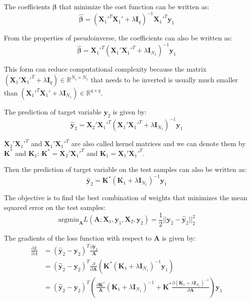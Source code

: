 \documentclass[a4paper,11pt]{article}
\begin{document}
The coefficients $\boldsymbol{\beta}$ that minimize the cost function can be written as:
\begin{equation}
\hat{\boldsymbol{\beta}} = (\mathbf{X}_1'^T \mathbf{X}_1' + \lambda \mathbf{I}_{q})^{-1} \mathbf{X}_1'^T \mathbf{y}_1
\end{equation}

From the properties of pseudoinverse, the coefficients can also be written as:
\begin{equation}
\hat{\boldsymbol{\beta}} = \mathbf{X}_1'^T (\mathbf{X}_1' \mathbf{X}_1'^T + \lambda \mathbf{I}_{N_1})^{-1} \mathbf{y}_1
\end{equation}

This form can reduce computational complexity because the matrix $(\mathbf{X}_1' \mathbf{X}_1'^T + \lambda \mathbf{I}_{q}) \in \mathbb{R}^{N_1 \times N_1}$ 
that needs to be inverted is usually much smaller than $(\mathbf{X}_1'^T \mathbf{X}_1' + \lambda \mathbf{I}_{N_1}) \in \mathbb{R}^{q \times q}$.

The prediction of target variable $\mathbf{y}_2$ is given by:
\begin{equation}
\hat{\mathbf{y}}_2 = \mathbf{X}_2' \mathbf{X}_1'^T (\mathbf{X}_1' \mathbf{X}_1'^T + \lambda \mathbf{I}_{N_1})^{-1} \mathbf{y}_1
\end{equation}

$\mathbf{X}_2' \mathbf{X}_1'^T$ and $\mathbf{X}_1' \mathbf{X}_1'^T$ are also called kernel matrices and we can denote them by $\mathbf{K}^{*}$ 
and $\mathbf{K}_1$: $\mathbf{K}^{*} = \mathbf{X}_2' \mathbf{X}_1'^T$ and $\mathbf{K}_1 = \mathbf{X}_1' \mathbf{X}_1'^T$.

Then the prediction of target variable on the test samples can also be written as:
\begin{equation}
\hat{\mathbf{y}}_2 = \mathbf{K}^{*} (\mathbf{K}_1 + \lambda \mathbf{I}_{N_1})^{-1} \mathbf{y}_1
\end{equation}

The objective is to find the best combination of weights that minimizes the mean squared error on the test samples:
\begin{equation}
\text{argmin}_{\mathbf{A}} L(\mathbf{A}; \mathbf{X}_1, \mathbf{y}_1, \mathbf{X}_2, \mathbf{y}_2 ) = \frac{1}{2} || \mathbf{y}_2 - \hat{\mathbf{y}}_2 ||_2^2
\end{equation}

The gradients of the loss function with respect to $\mathbf{A}$ is given by:
\begin{align}
\frac{\partial L} {\partial A} &= (\hat{\mathbf{y}}_2 - \mathbf{y}_2)^{T} \frac{\partial{\hat{\mathbf{y}}_2}} {\mathbf{A}} \\
&= (\hat{\mathbf{y}}_2 - \mathbf{y}_2)^{T}  \frac{\partial}{\partial \mathbf{A}} (\mathbf{K}^{*} (\mathbf{K}_1 + \lambda \mathbf{I}_{N_1})^{-1} \mathbf{y}_1) \\
&=  (\hat{\mathbf{y}}_2 - \mathbf{y}_2)^{T} \left( \frac{\partial \mathbf{K}^{*}} {\mathbf{A}} (\mathbf{K}_1 + \lambda \mathbf{I}_{N_1})^{-1}
+ \mathbf{K}^{*} \frac{\partial (\mathbf{K}_1 + \lambda \mathbf{I}_{N_1})^{-1}} {\partial \mathbf{A} } \right) \mathbf{y}_1
\end{align}
\end{document}
